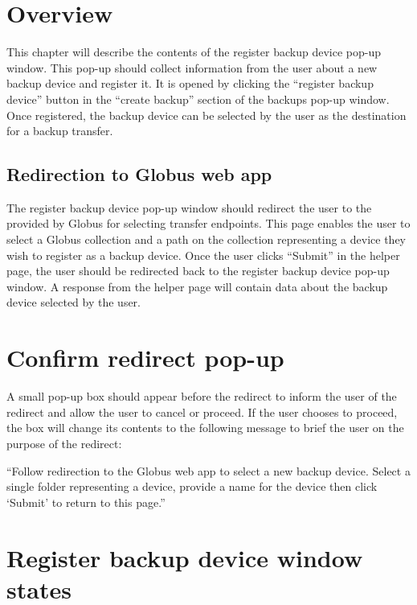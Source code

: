 
\section{Overview}

This chapter will describe the contents of the register backup device pop-up 
window. This pop-up should collect information from the user about a new backup device 
and register it. It is opened by clicking the ``register backup device'' button in 
the ``create backup'' section of the backups pop-up window. Once registered, the 
backup device can be selected by the user as the destination for a backup transfer.

\subsection{Redirection to Globus web app}

The register backup device pop-up window should redirect the user to the 
 provided by Globus for 
selecting transfer endpoints. This page enables the user to select a Globus collection
and a path on the collection representing a device they wish to register as a backup device. 
Once the user clicks ``Submit'' in the helper page, the user should be redirected back to 
the register backup device pop-up window. A response from the helper page will contain 
data about the backup device selected by the user.

\section{Confirm redirect pop-up\label{sec:confirm-redirect-popup}}

A small pop-up box should appear before the redirect to inform the user of the redirect 
and allow the user to cancel or proceed. If the user chooses to proceed, the box will change 
its contents to the following message to brief the user on the purpose of the redirect:

\vspace{3mm}
``Follow redirection to the Globus web app to select a new backup device. Select a single
folder representing a device, provide a name for the device then click `Submit' to return 
to this page.''
\vspace{3mm}

\section{Register backup device window states}


